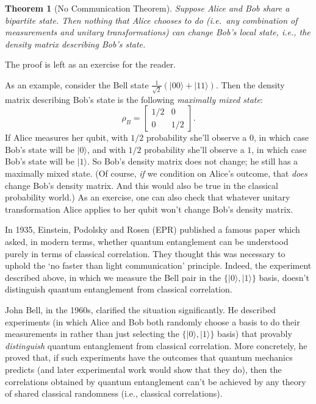 \documentclass[12pt]{report}
\theoremstyle{plain}
\newtheorem{theorem}{Theorem}[section]
\theoremstyle{definition}
\renewcommand{\ket}[1]{|#1\rangle}
\begin{document}
\begin{theorem}[No Communication Theorem]
Suppose Alice and Bob share a bipartite state. Then nothing that Alice chooses to do (i.e.\ any combination of measurements and unitary transformations) can change Bob's local state, i.e., the density matrix describing Bob's state.
\end{theorem}

The proof is left as an exercise for the reader.

As an example, consider the Bell state $\frac{1}{\sqrt{2}} (\ket{00} + \ket{11})$. Then the density matrix describing Bob's state is the following \emph{maximally mixed state}:
\[
\rho_B = \begin{bmatrix}
1/2 & 0 \\
0 & 1/2
\end{bmatrix}.
\]
If Alice measures her qubit, with $1/2$ probability she'll observe a $0$, in which case Bob's state will be $\ket{0}$, and with $1/2$ probability she'll observe a $1$, in which case Bob's state will be $\ket{1}$. So Bob's density matrix does not change; he still has a maximally mixed state. (Of course, \emph{if} we condition on Alice's outcome, that \emph{does} change Bob's density matrix. And this would also be true in the classical probability world.) As an exercise, one can also check that whatever unitary transformation Alice applies to her qubit won't change Bob's density matrix.

In 1935, Einstein, Podolsky and Rosen (EPR) published a famous paper which asked, in modern terms, whether quantum entanglement can be understood purely in terms of classical correlation.  They thought this was necessary to uphold the `no faster than light communication' principle. Indeed, the experiment described above, in which we measure the Bell pair in the $\{\ket{0}, \ket{1}\}$ basis, doesn't distinguish quantum entanglement from classical correlation.

John Bell, in the 1960s, clarified the situation significantly. He described experiments (in which Alice and Bob both randomly choose a basis to do their measurements in rather than just selecting the $\{\ket{0}, \ket{1}\}$ basis) that provably {\em distinguish} quantum entanglement from classical correlation.  More concretely, he proved that, if such experiments have the outcomes that quantum mechanics predicts (and later experimental work would show that they do), then the correlations obtained by quantum entanglement can't be achieved by any theory of shared classical randomness (i.e., classical correlations).
\end{document}
